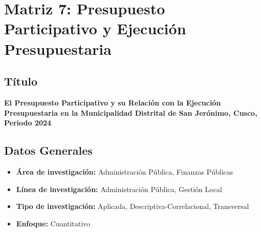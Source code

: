 \documentclass[
  man,
  floatsintext,
  longtable,
  a4paper,
  nolmodern,
  notxfonts,
  notimes,
  12pt,
  colorlinks=true,linkcolor=blue,citecolor=blue,urlcolor=blue]{apa7}
\providecommand{\tightlist}{%
  \setlength{\itemsep}{0pt}\setlength{\parskip}{0pt}}
\begin{document}
\section{Matriz 7: Presupuesto Participativo y Ejecución
Presupuestaria}\label{matriz-7-presupuesto-participativo-y-ejecuciuxf3n-presupuestaria}

\subsection{Título}\label{tuxedtulo-6}

\textbf{El Presupuesto Participativo y su Relación con la Ejecución
Presupuestaria en la Municipalidad Distrital de San Jerónimo, Cusco,
Periodo 2024}

\subsection{Datos Generales}\label{datos-generales-6}

\begin{itemize}
\tightlist
\item
  \textbf{Área de investigación:} Administración Pública, Finanzas
  Públicas
\item
  \textbf{Línea de investigación:} Administración Pública, Gestión Local
\item
  \textbf{Tipo de investigación:} Aplicada, Descriptiva-Correlacional,
  Transversal
\item
  \textbf{Enfoque:} Cuantitativo
\end{itemize}
\end{document}
